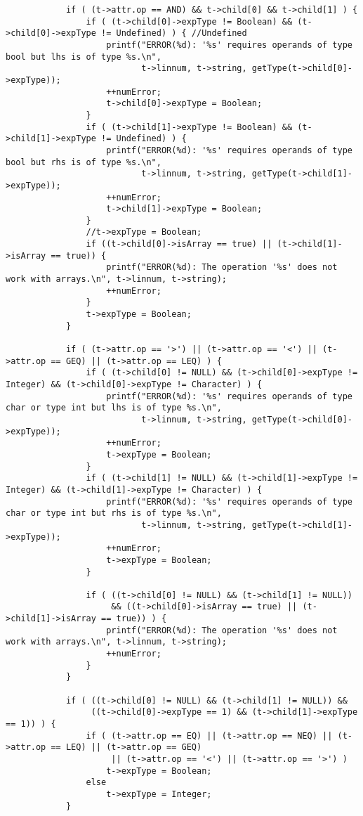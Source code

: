\documentclass[12pt]{book}
\begin{document}
\begin{lstlisting}
            if ( (t->attr.op == AND) && t->child[0] && t->child[1] ) {
                if ( (t->child[0]->expType != Boolean) && (t->child[0]->expType != Undefined) ) { //Undefined
                    printf("ERROR(%d): '%s' requires operands of type bool but lhs is of type %s.\n", 
                           t->linnum, t->string, getType(t->child[0]->expType));
                    ++numError;
                    t->child[0]->expType = Boolean;
                }
                if ( (t->child[1]->expType != Boolean) && (t->child[1]->expType != Undefined) ) {
                    printf("ERROR(%d): '%s' requires operands of type bool but rhs is of type %s.\n", 
                           t->linnum, t->string, getType(t->child[1]->expType));
                    ++numError;
                    t->child[1]->expType = Boolean;
                }
                //t->expType = Boolean; 
                if ((t->child[0]->isArray == true) || (t->child[1]->isArray == true)) {
                    printf("ERROR(%d): The operation '%s' does not work with arrays.\n", t->linnum, t->string);
                    ++numError;
                }
                t->expType = Boolean; 
            }

            if ( (t->attr.op == '>') || (t->attr.op == '<') || (t->attr.op == GEQ) || (t->attr.op == LEQ) ) {
                if ( (t->child[0] != NULL) && (t->child[0]->expType != Integer) && (t->child[0]->expType != Character) ) {
                    printf("ERROR(%d): '%s' requires operands of type char or type int but lhs is of type %s.\n", 
                           t->linnum, t->string, getType(t->child[0]->expType));
                    ++numError;
                    t->expType = Boolean;
                } 
                if ( (t->child[1] != NULL) && (t->child[1]->expType != Integer) && (t->child[1]->expType != Character) ) {
                    printf("ERROR(%d): '%s' requires operands of type char or type int but rhs is of type %s.\n", 
                           t->linnum, t->string, getType(t->child[1]->expType));
                    ++numError;
                    t->expType = Boolean;
                }

                if ( ((t->child[0] != NULL) && (t->child[1] != NULL)) 
                     && ((t->child[0]->isArray == true) || (t->child[1]->isArray == true)) ) {
                    printf("ERROR(%d): The operation '%s' does not work with arrays.\n", t->linnum, t->string);
                    ++numError;
                }
            }

            if ( ((t->child[0] != NULL) && (t->child[1] != NULL)) && 
                 ((t->child[0]->expType == 1) && (t->child[1]->expType == 1)) ) {
                if ( (t->attr.op == EQ) || (t->attr.op == NEQ) || (t->attr.op == LEQ) || (t->attr.op == GEQ) 
                     || (t->attr.op == '<') || (t->attr.op == '>') ) 
                    t->expType = Boolean;
                else 
                    t->expType = Integer;
            }


\end{lstlisting}
\end{document}
